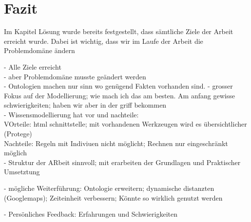 \chapter{Fazit}
\label{chap:fazit}


Im Kapitel Lösung wurde bereits festgestellt, dass sämtliche Ziele der Arbeit erreicht wurde. Dabei ist wichtig, dass wir im Laufe der Arbeit die Problemdomäne ändern 


- Alle Ziele erreicht\\
- aber Problemdomäne musste geändert werden\\
- Ontologien machen nur sinn wo genügend Fakten vorhanden sind.
- grosser Fokus auf der Modellierung; wie mach ich das am besten. Am anfang gewisse schwierigkeiten; haben wir aber in der griff bekommen\\
- Wissensmodellierung hat vor und nachteile:\\
VOrteile: html schnittstelle; mit vorhandenen Werkzeugen wird es übersichtlicher (Protege)\\
Nachteile: Regeln mit Indiviuen nicht möglicht; Rechnen nur eingeschränkt möglich\\
- Struktur der ARbeit sinnvoll; mit erarbeiten der Grundlagen und Praktischer Umsetztung


- mögliche Weiterführung: Ontologie erweitern; dynamische distanzten (Googlemaps); Zeiteinheit verbessern; Könnte so wirklich genutzt werden

- Persönliches Feedback: Erfahrungen und Schwierigkeiten

